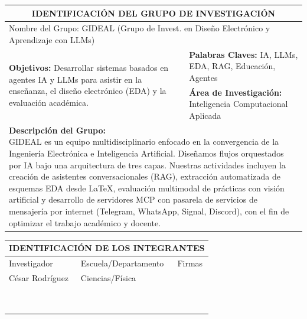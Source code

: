 \documentclass[12pt, a4paper]{article}
\begin{document}
\vspace{0.5cm}

\noindent
\begin{tabularx}{\textwidth}{|X|X|}
\hline
\multicolumn{2}{|c|}{\cellcolor[gray]{0.9}\textbf{IDENTIFICACIÓN DEL GRUPO DE INVESTIGACIÓN}} \\
\hline
\multicolumn{2}{|l|}{Nombre del Grupo: GIDEAL (Grupo de Invest. en Diseño Electrónico y Aprendizaje con LLMs)} \\
\hline
\multirow{2}{=}{\textbf{Objetivos:} {\footnotesize Desarrollar sistemas basados en agentes IA y LLMs para asistir en la enseñanza, el diseño electrónico (EDA) y la evaluación académica.}} & \textbf{Palabras Claves:} {\footnotesize IA, LLMs, EDA, RAG, Educación, Agentes} \\
\cline{2-2}
 & \textbf{Área de Investigación:} {\footnotesize Inteligencia Computacional Aplicada} \\
\hline
\multicolumn{2}{|p{\dimexpr\textwidth-2\tabcolsep-2\arrayrulewidth\relax}|}{\textbf{Descripción del Grupo:} \newline {\footnotesize GIDEAL es un equipo multidisciplinario enfocado en la convergencia de la Ingeniería Electrónica e Inteligencia Artificial. Diseñamos flujos orquestados por IA bajo una arquitectura de tres capas. Nuestras actividades incluyen la creación de asistentes conversacionales (RAG), extracción automatizada de esquemas EDA desde LaTeX, evaluación multimodal de prácticas con visión artificial y desarrollo de servidores MCP con pasarela de servicios de mensajería por internet (Telegram, WhatsApp, Signal, Discord), con el fin de optimizar el trabajo académico y docente.}} \\[1.5cm]
\hline
\end{tabularx}

\newpage

\noindent
\begin{tabularx}{\textwidth}{|X|X|X|}
\hline
\multicolumn{3}{|c|}{\cellcolor[gray]{0.9}\textbf{IDENTIFICACIÓN DE LOS INTEGRANTES}} \\
\hline
Investigador & Escuela/Departamento & Firmas \\
\hline
César Rodríguez & Ciencias/Física & \\ \hline
 & & \\ \hline
 & & \\ \hline
 & & \\ \hline
 & & \\ \hline
 & & \\ \hline
 & & \\ \hline
 & & \\ \hline
 & & \\ \hline
 & & \\ \hline
\end{tabularx}
\end{document}
